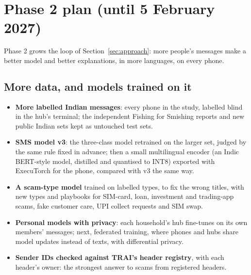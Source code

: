 \documentclass[11pt,a4paper]{article}
\begin{document}
\section{Phase 2 plan (until 5 February 2027)}
\label{sec:phase2}

Phase 2 grows the loop of Section~\ref{sec:approach}: more people's messages make a better model and better explanations,
in more languages, on every phone.

\subsection{More data, and models trained on it}
\begin{itemize}
  \item \textbf{More labelled Indian messages}: every phone in the study, labelled blind in the hub's terminal; the
        independent Fishing for Smishing reports and new public Indian sets kept as untouched test sets.
  \item \textbf{SMS model v3}: the three-class model retrained on the larger set, judged by the same rule fixed in
        advance; then a small multilingual encoder (an Indic BERT-style model, distilled and quantised to INT8) exported
        with ExecuTorch for the phone, compared with v3 the same way.
  \item \textbf{A scam-type model} trained on labelled types, to fix the wrong titles, with new types and playbooks for
        SIM-card, loan, investment and trading-app scams, fake customer care, UPI collect requests and SIM swap.
  \item \textbf{Personal models with privacy}: each household's hub fine-tunes on its own members' messages; next,
        federated training, where phones and hubs share model updates instead of texts, with differential privacy.
  \item \textbf{Sender IDs checked against TRAI's header registry}, with each header's owner: the strongest answer to
        scams from registered headers.
\end{itemize}
\end{document}
